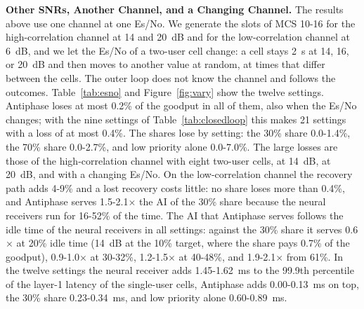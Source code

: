 \documentclass[acmsmall,screen,review,anonymous]{acmart}
\newcommand{\sys}{Antiphase\xspace}
\begin{document}
\noindent\textbf{Other SNRs, Another Channel, and a Changing Channel.} The results above use one channel at
one Es/No. We generate the slots of MCS 10-16 for the high-correlation channel at 14 and 20~dB and for the
low-correlation channel at 6~dB, and we let the Es/No of a two-user cell change: a cell stays 2~s at 14, 16,
or 20~dB and then moves to another value at random, at times that differ between the cells. The outer loop
does not know the channel and follows the outcomes. Table~\ref{tab:esno} and Figure~\ref{fig:vary} show the
twelve settings. \sys loses at most 0.2\% of the goodput in all of them, also when the Es/No changes; with
the nine settings of Table~\ref{tab:closedloop} this makes 21 settings with a loss of at most 0.4\%. The
shares lose by setting: the 30\% share 0.0-1.4\%, the 70\% share 0.0-2.7\%, and low priority alone
0.0-7.0\%. The large losses are those of the high-correlation channel with eight two-user cells, at 14~dB,
at 20~dB, and with a changing Es/No. On the low-correlation channel the recovery path adds 4-9\% and a lost
recovery costs little: no share loses more than 0.4\%, and \sys serves 1.5-2.1$\times$ the AI of the 30\%
share because the neural receivers run for 16-52\% of the time. The AI that \sys serves follows the idle
time of the neural receivers in all settings: against the 30\% share it serves 0.6$\times$ at 20\% idle
time (14~dB at the 10\% target, where the share pays 0.7\% of the goodput), 0.9-1.0$\times$ at 30-32\%,
1.2-1.5$\times$ at 40-48\%, and 1.9-2.1$\times$ from 61\%. In the twelve settings the neural receiver
adds 1.45-1.62~ms to the 99.9th percentile of the layer-1 latency of the single-user cells, \sys adds
0.00-0.13~ms on top, the 30\% share 0.23-0.34~ms, and low priority alone 0.60-0.89~ms.
\end{document}
